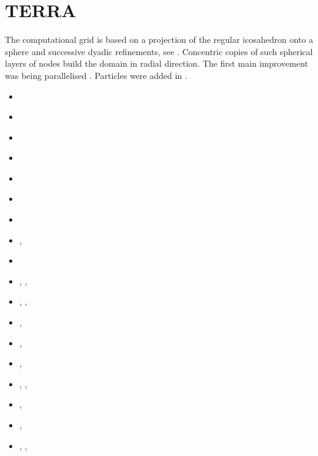 \section{TERRA} 
The computational grid is based on a projection of the regular icosahedron onto a 
sphere and successive dyadic refinements, see \textcite{bafr85}.  Concentric copies of such  
spherical layers of nodes build the domain in radial direction.
The first main improvement was being parallelised \textcite{buba95}.
Particles were added in \textcite{strb02}.

\begin{small}
\begin{itemize}
\item[\nineteeneightythree]    \textcite{baum83}
\item[\nineteeneightyfive]     \textcite{baum85}
\item[\nineteeneightyeight]    \textcite{glat88}
\item[\nineteenninetythree]    \textcite{tasg93}
\item[\nineteenninetyfour]     \textcite{tasg94}
\item[\nineteenninetyfive]     \textcite{buba95}
\item[\nineteenninetysix]      \textcite{buri96}
\item[\nineteenninetyseven]    \textcite{burb97},  \textcite{yang97}
\item[\nineteenninetyeight]    \textcite{burl98}
\item[\nineteenninetynine]     \textcite{tabg99},  \textcite{ribr99}, \textcite{resb99}
\item[\twothousandone]         \textcite{buda01},  \textcite{burm01}, \textcite{dabu01}
\item[\twothousandtwo]         \textcite{burb02},  \textcite{strb02}
\item[\twothousandthree]       \textcite{buht03},  \textcite{stjz03}
\item[\twothousandfour]        \textcite{resb04},  \textcite{wahb04}
\item[\twothousandfive]        \textcite{resb05},  \textcite{phbu05},  \textcite{funk05}
\item[\twothousandsix]         \textcite{dabu06},  \textcite{gowh06}
\item[\twothousandseven]       \textcite{phbu07},  \textcite{huda07b}
\item[\twothousandeight]       \textcite{heib08},  \textcite{shlj08},  \textcite{wahe08}

\end{itemize}
\end{small}
